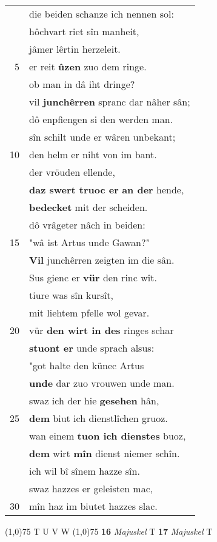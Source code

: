 \documentclass[8pt,a4paper,notitlepage]{article}
\begin{document}
\begin{table}[ht]
\begin{minipage}[t]{0.5\linewidth}
\begin{tabular}{rl}
 & die beiden schanze ich nennen sol:\\ 
 & hôchvart riet sîn manheit,\\ 
 & jâmer lêrtin herzeleit.\\ 
5 & er reit \textbf{ûzen} zuo dem ringe.\\ 
 & ob man in dâ iht dringe?\\ 
 & vil \textbf{junchêrren} spranc dar nâher sân;\\ 
 & dô enpfiengen si den werden man.\\ 
 & sîn schilt unde er wâren unbekant;\\ 
10 & den helm er niht von im bant.\\ 
 & der vröuden ellende,\\ 
 & \textbf{daz swert truoc er} \textbf{an der} hende,\\ 
 & \textbf{bedecket} mit der scheiden.\\ 
 & dô vrâgeter nâch in beiden:\\ 
15 & "wâ ist Artus unde Gawan?"\\ 
 & \textbf{Vil} junchêrren zeigten im die sân.\\ 
 & Sus gienc er \textbf{vür} den rinc wît.\\ 
 & tiure was sîn kursît,\\ 
 & mit liehtem pfelle wol gevar.\\ 
20 & vür \textbf{den wirt in des} ringes schar\\ 
 & \textbf{stuont er} unde sprach alsus:\\ 
 & "got halte den künec Artus\\ 
 & \textbf{unde} dar zuo vrouwen unde man.\\ 
 & swaz ich der hie \textbf{gesehen} hân,\\ 
25 & \textbf{dem} biut ich dienstlîchen gruoz.\\ 
 & wan einem \textbf{tuon ich dienstes} buoz,\\ 
 & \textbf{dem} wirt \textbf{mîn} dienst niemer schîn.\\ 
 & ich wil bî sînem hazze sîn.\\ 
 & swaz hazzes er geleisten mac,\\ 
30 & mîn haz im biutet hazzes slac.\\ 
\end{tabular}
\scriptsize
\line(1,0){75} \newline
T U V W \newline
\line(1,0){75} \newline
\textbf{16} \textit{Majuskel} T  \textbf{17} \textit{Majuskel} T  \newline

\end{minipage}
\end{table}
\end{document}
